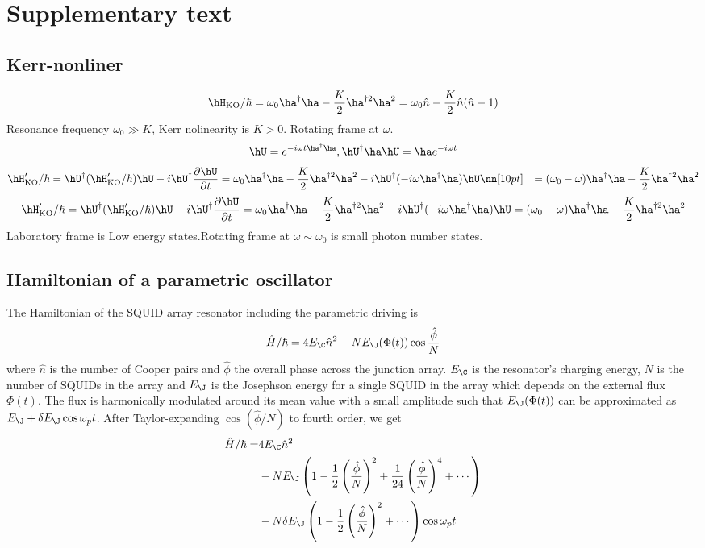 \section{Supplementary text}
\subsection{Kerr-nonliner}
\begin{equation}
    \hH_{\rm{KO}}/\hbar=\omega_0\ha^\dag\ha-\frac{K}{2}\ha^{\dag2}\ha^2
    =\omega_0\hat{n}-\frac{K}{2}\hat{n}(\hat{n}-1)
\end{equation}
Resonance frequency $\omega_0\gg K$, Kerr nolinearity is $K>0$.
Rotating frame at $\omega$.
\begin{equation}
    \hU=e^{-i\omega t\ha^\dag \ha}, \hU^\dag\ha\hU=\ha e^{-i\omega t}
\end{equation}
\begin{align}
    \hH_{\rm{KO}}^\prime/\hbar
    &=\hU^\dag(\hH_{\rm{KO}}^\prime/\hbar)\hU
    -i\hU^\dag\frac{\partial\hU}{\partial t}
    =\omega_0\ha^\dag\ha-\frac{K}{2}\ha^{\dag2}\ha^2
    -i\hU^\dag (-i\omega \ha^\dag\ha)\hU\nn[10pt]
    &=(\omega_0-\omega)\ha^\dag\ha-\frac{K}{2}\ha^{\dag2}\ha^2
\end{align}
\begin{equation}
    \hH_{\rm{KO}}^\prime/\hbar
    =\hU^\dag(\hH_{\rm{KO}}^\prime/\hbar)\hU
    -i\hU^\dag\frac{\partial\hU}{\partial t}
    =\omega_0\ha^\dag\ha-\frac{K}{2}\ha^{\dag2}\ha^2
    -i\hU^\dag (-i\omega \ha^\dag\ha)\hU
    =(\omega_0-\omega)\ha^\dag\ha-\frac{K}{2}\ha^{\dag2}\ha^2
\end{equation}
Laboratory frame is Low energy states.Rotating frame at $\omega\sim\omega_0$ is small photon number states.


\subsection{Hamiltonian of a parametric oscillator}
The Hamiltonian of the SQUID array resonator including the parametric driving is
\begin{equation}
\hat{H}/\hbar = 4 E_{\C} \hat{n}^2 - N E_\J (\Phi(t)) \cos{\frac{\hat{\phi}}{N}}
\end{equation}
where $\hat{n}$ is the number of Cooper pairs and $\hat{\phi}$ the overall phase across the junction array. $E_\C$ is the resonator's charging energy, $N$ is the number of SQUIDs in the array and $E_\J$ is the Josephson energy for a single SQUID in the array which depends on the external flux $\Phi(t)$. The flux is harmonically modulated around its mean value with a small amplitude such that $E_\J(\Phi(t))$ can be approximated as $E_\J + \delta E_\J \cos\omega_p t$. After Taylor-expanding $\cos(\hat{\phi}/N)$ to fourth order, we get
\begin{align}
    \hat{H}/\hbar = & 4 E_\C \hat{n}^2 \\
    & - N E_\J \left(
    1 - \frac{1}{2} \left( \frac{\hat{\phi}}{N} \right)^2 + \frac{1}{24} \left( \frac{\hat{\phi}}{N} \right)^4 + \cdots
    \right)\\
    & - N\delta E_\J \left(
    1 - \frac{1}{2} \left( \frac{\hat{\phi}}{N} \right)^2 + \cdots
\right) \cos\omega_p t
\end{align}

